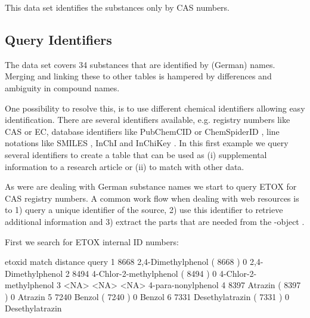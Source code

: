 \documentclass[article, shortnames]{jss}\usepackage[]{graphicx}\usepackage[]{color}
\begin{document}
This data set identifies the substances only by CAS numbers.


\subsection[Query Identifiers]{Query Identifiers}
The  data set covers 34 substances that are identified by (German) names.
Merging and linking these to other tables is hampered by differences and ambiguity in compound names.

One possibility to resolve this, is to use different chemical identifiers allowing easy identification.
There are several identifiers available, e.g.  registry numbers like CAS or EC, database identifiers like PubChemCID \citep{Kim_2016} or ChemSpiderID \citep{pence_chemspider:_2010}, line notations like SMILES \citep{Weininger_1990}, InChI and InChiKey \citep{Heller_McNaught_Pletnev_Stein_Tchekhovskoi_2015}. 
In this first example we query several identifiers to create a table that can be used as (i) supplemental information to a research article or (ii) to match with other data.

As were are dealing with German substance names we start to query ETOX for CAS registry numbers.
A common work flow when dealing with web resources is to 1) query a unique identifier of the source, 2) use this identifier to retrieve additional information and 3) extract the parts that are needed from the -object \citep{Chamberlain_Szocs_2013}.

First we search for ETOX internal ID numbers:

\begin{CodeChunk}
\begin{CodeOutput}
  etoxid                           match distance                  query
1   8668     2,4-Dimethylphenol ( 8668 )        0     2,4-Dimethylphenol
2   8494 4-Chlor-2-methylphenol ( 8494 )        0 4-Chlor-2-methylphenol
3   <NA>                            <NA>     <NA>     4-para-nonylphenol
4   8397                Atrazin ( 8397 )        0                Atrazin
5   7240                 Benzol ( 7240 )        0                 Benzol
6   7331        Desethylatrazin ( 7331 )        0        Desethylatrazin
\end{CodeOutput}
\end{CodeChunk}
\end{document}
